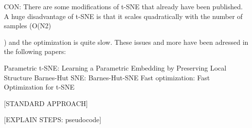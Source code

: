 \documentclass[journal, a4paper]{IEEEtran}
\begin{document}
CON: There are some modifications of t-SNE that already have been published. A huge disadvantage of t-SNE is that it scales quadratically with the number of samples (O(N2)

) and the optimization is quite slow. These issues and more have been adressed in the following papers:

Parametric t-SNE: Learning a Parametric Embedding by Preserving Local Structure
Barnes-Hut SNE: Barnes-Hut-SNE
Fast optimization: Fast Optimization for t-SNE



%
%
% 
%


[STANDARD APPROACH]

[EXPLAIN STEPS: pseudocode]

\end{document}
